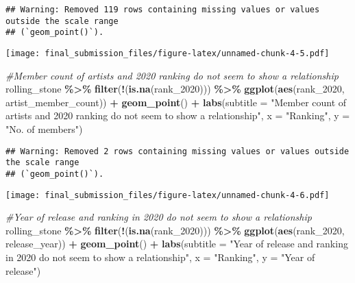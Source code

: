 \documentclass[
]{article}
\newenvironment{Shaded}{\begin{snugshade}}{\end{snugshade}}
\newcommand{\AttributeTok}[1]{\textcolor[rgb]{0.13,0.29,0.53}{#1}}
\newcommand{\CommentTok}[1]{\textcolor[rgb]{0.56,0.35,0.01}{\textit{#1}}}
\newcommand{\FunctionTok}[1]{\textcolor[rgb]{0.13,0.29,0.53}{\textbf{#1}}}
\newcommand{\NormalTok}[1]{#1}
\newcommand{\SpecialCharTok}[1]{\textcolor[rgb]{0.81,0.36,0.00}{\textbf{#1}}}
\newcommand{\StringTok}[1]{\textcolor[rgb]{0.31,0.60,0.02}{#1}}
\begin{document}
\begin{verbatim}
## Warning: Removed 119 rows containing missing values or values outside the scale range
## (`geom_point()`).
\end{verbatim}

\texttt{[image: final\_submission\_files/figure-latex/unnamed-chunk-4-5.pdf]}

\begin{Shaded}
\begin{Highlighting}[]
\CommentTok{\#Member count of artists and 2020 ranking do not seem to show a relationship}
\NormalTok{rolling\_stone }\SpecialCharTok{\%\textgreater{}\%}
  \FunctionTok{filter}\NormalTok{(}\SpecialCharTok{!}\NormalTok{(}\FunctionTok{is.na}\NormalTok{(rank\_2020))) }\SpecialCharTok{\%\textgreater{}\%}
  \FunctionTok{ggplot}\NormalTok{(}\FunctionTok{aes}\NormalTok{(rank\_2020, artist\_member\_count)) }\SpecialCharTok{+}
  \FunctionTok{geom\_point}\NormalTok{() }\SpecialCharTok{+}
  \FunctionTok{labs}\NormalTok{(}\AttributeTok{subtitle =} \StringTok{"Member count of artists and 2020 ranking do not seem to show a relationship"}\NormalTok{, }\AttributeTok{x =} \StringTok{"Ranking"}\NormalTok{, }\AttributeTok{y =} \StringTok{"No. of members"}\NormalTok{)}
\end{Highlighting}
\end{Shaded}

\begin{verbatim}
## Warning: Removed 2 rows containing missing values or values outside the scale range
## (`geom_point()`).
\end{verbatim}

\texttt{[image: final\_submission\_files/figure-latex/unnamed-chunk-4-6.pdf]}

\begin{Shaded}
\begin{Highlighting}[]
\CommentTok{\#Year of release and ranking in 2020 do not seem to show a relationship}
\NormalTok{rolling\_stone }\SpecialCharTok{\%\textgreater{}\%}
  \FunctionTok{filter}\NormalTok{(}\SpecialCharTok{!}\NormalTok{(}\FunctionTok{is.na}\NormalTok{(rank\_2020))) }\SpecialCharTok{\%\textgreater{}\%}
  \FunctionTok{ggplot}\NormalTok{(}\FunctionTok{aes}\NormalTok{(rank\_2020, release\_year)) }\SpecialCharTok{+}
  \FunctionTok{geom\_point}\NormalTok{() }\SpecialCharTok{+}
  \FunctionTok{labs}\NormalTok{(}\AttributeTok{subtitle =} \StringTok{"Year of release and ranking in 2020 do not seem to show a relationship"}\NormalTok{, }\AttributeTok{x =} \StringTok{"Ranking"}\NormalTok{, }\AttributeTok{y =} \StringTok{"Year of release"}\NormalTok{)}
\end{Highlighting}
\end{Shaded}
\end{document}
